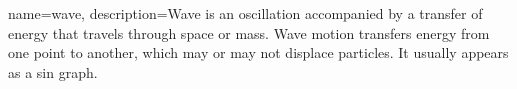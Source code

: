 {
    name=wave,
    description={Wave is an oscillation accompanied by a transfer of energy that travels through space or mass. Wave motion transfers energy from one point to another, which may or may not displace particles. It usually appears as a sin graph.}
}
